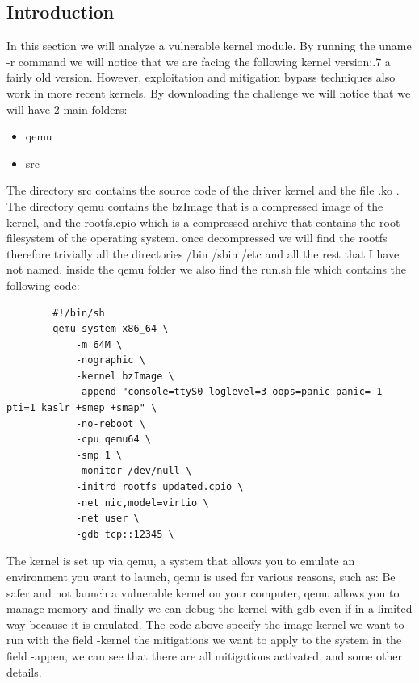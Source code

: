     \subsection{Introduction}
    In this section we will analyze a vulnerable kernel module.\newline
    By running the uname -r command we will notice that we are facing the following kernel version:.7 a fairly old version.\newline
    However, exploitation and mitigation bypass techniques also work in more recent kernels.\newline
    By downloading the challenge we will notice that we will have 2 main folders:\newline
    \begin{itemize}
        \item qemu 
        \item src 
    \end{itemize}
    The directory src contains the source code of the driver kernel and the file .ko .\newline
    The directory qemu contains the bzImage that is a compressed image of the kernel, and the rootfs.cpio which is a compressed archive that contains the root filesystem of the operating system.\newline
    once decompressed we will find the rootfs therefore trivially all the directories /bin /sbin /etc and all the rest that I have not named. \newline
    inside the qemu folder we also find the run.sh file which contains the following code:\newline
    
    \begin{verbatim}
        #!/bin/sh
        qemu-system-x86_64 \
            -m 64M \
            -nographic \
            -kernel bzImage \
            -append "console=ttyS0 loglevel=3 oops=panic panic=-1 pti=1 kaslr +smep +smap" \
            -no-reboot \
            -cpu qemu64 \
            -smp 1 \
            -monitor /dev/null \
            -initrd rootfs_updated.cpio \
            -net nic,model=virtio \
            -net user \
            -gdb tcp::12345 \
    \end{verbatim}
    The kernel is set up via qemu, a system that allows you to emulate an environment you want to launch, qemu is used for various reasons, such as:\newline
    Be safer and not launch a vulnerable kernel on your computer, qemu allows you to manage memory and finally we can debug the kernel with gdb even if in a limited way because it is emulated.\newline
    The code above specify the image kernel we want to run with the field -kernel the mitigations we want to apply to the system in the field -appen, we can see that there are all mitigations activated, and some other details.\newline

